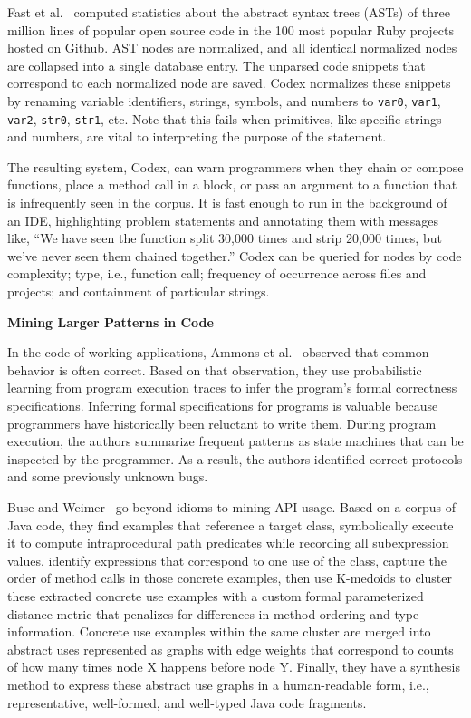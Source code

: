 Fast et al.~\cite{codex} computed statistics about the abstract syntax trees (ASTs) of three million lines of popular open source code in the 100 most popular Ruby projects hosted on Github. AST nodes are normalized, and all identical normalized nodes are collapsed into a single database entry. The unparsed code snippets that correspond to each normalized node are saved. Codex normalizes these snippets by renaming variable identifiers, strings, symbols, and numbers to \texttt{var0}, \texttt{var1}, \texttt{var2}, \texttt{str0}, \texttt{str1}, etc. Note that this fails when primitives, like specific strings and numbers, are vital to interpreting the purpose of the statement.

The resulting system, Codex, can warn programmers when they chain or compose functions, place a method call in a block, or pass an argument to a function that is infrequently seen in the corpus. It is fast enough to run in the background of an IDE, highlighting problem statements and annotating them with messages like, ``We have seen the function split 30,000 times and strip 20,000 times, but we've never seen them chained together.'' Codex can be queried for nodes by code complexity; type, i.e., function call; frequency of occurrence across files and projects; and containment of particular strings.

{\bf Mining Larger Patterns in Code}

In the code of working applications, Ammons et al.~\cite{ammons2002mining} observed that common behavior is often correct. Based on that observation, they use probabilistic learning from program execution traces to infer the program's formal correctness specifications. Inferring formal specifications for programs is valuable because programmers have historically been reluctant to write them. During program execution, the authors summarize frequent patterns as state machines that can be inspected by the programmer. As a result, the authors identified correct protocols and some previously unknown bugs.

Buse and Weimer~\cite{buse2012synthesizing} go beyond idioms to mining API usage. Based on a corpus of Java code, they find examples that reference a target class, symbolically execute it to compute intraprocedural path predicates while recording all subexpression values, identify expressions that correspond to one use of the class, capture the order of method calls in those concrete examples, then use K-medoids to cluster these extracted concrete use examples with a custom formal parameterized distance metric that penalizes for differences in method ordering and type information. Concrete use examples within the same cluster are merged into abstract uses represented as graphs with edge weights that correspond to counts of how many times node X happens before node Y. Finally, they have a synthesis method to express these abstract use graphs in a human-readable form, i.e., representative, well-formed, and well-typed Java code fragments.

